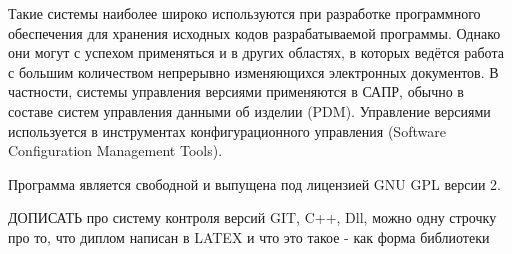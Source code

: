Такие системы наиболее широко используются при разработке программного обеспечения для хранения исходных кодов разрабатываемой программы. Однако они могут с успехом применяться и в других областях, в которых ведётся работа с большим количеством непрерывно изменяющихся электронных документов. В частности, системы управления версиями применяются в САПР, обычно в составе систем управления данными об изделии (PDM). Управление версиями используется в инструментах конфигурационного управления (Software Configuration Management Tools).

Программа является свободной и выпущена под лицензией GNU GPL версии 2.

ДОПИСАТЬ про систему контроля версий GIT, C++, Dll, можно одну строчку про то, что диплом написан в LATEX и что это такое - как форма библиотеки











